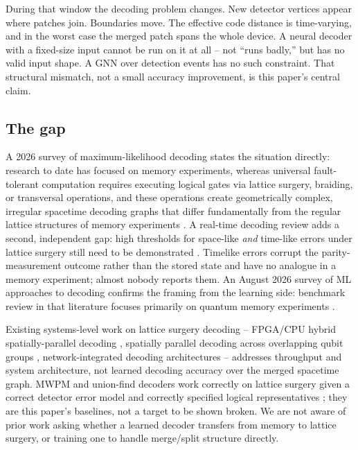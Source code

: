 \documentclass[11pt]{article}
\begin{document}
During that window the decoding problem changes. New detector vertices
appear where patches join. Boundaries move. The effective code distance is
time-varying, and in the worst case the merged patch spans the whole device.
A neural decoder with a fixed-size input cannot be run on it at all -- not
``runs badly,'' but has no valid input shape. A GNN over detection events has
no such constraint. That structural mismatch, not a small accuracy
improvement, is this paper's central claim.

\subsection{The gap}

A 2026 survey of maximum-likelihood decoding states the situation directly:
research to date has focused on memory experiments, whereas universal
fault-tolerant computation requires executing logical gates via lattice
surgery, braiding, or transversal operations, and these operations create
geometrically complex, irregular spacetime decoding graphs that differ
fundamentally from the regular lattice structures of memory experiments
\cite{mld2026}. A real-time decoding review adds a second, independent gap:
high thresholds for space-like \emph{and} time-like errors under lattice
surgery still need to be demonstrated \cite{realtime2023}. Timelike errors
corrupt the parity-measurement outcome rather than the stored state and have
no analogue in a memory experiment; almost nobody reports them. An August
2026 survey of ML approaches to decoding confirms the framing from the
learning side: benchmark review in that literature focuses primarily on
quantum memory experiments \cite{mlsurvey2026}.

Existing systems-level work on lattice surgery decoding -- FPGA/CPU hybrid
spatially-parallel decoding \cite{latte2025}, spatially parallel decoding
across overlapping qubit groups \cite{parallel2024}, network-integrated
decoding architectures \cite{netdecode2024} -- addresses throughput and
system architecture, not learned decoding accuracy over the merged spacetime
graph. MWPM and union-find decoders work correctly on lattice surgery given a
correct detector error model and correctly specified logical representatives
\cite{realtime2023}; they are this paper's baselines, not a target to be
shown broken. We are not aware of prior work asking whether a learned
decoder transfers from memory to lattice surgery, or training one to handle
merge/split structure directly.
\end{document}
